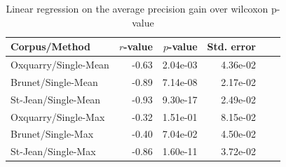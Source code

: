 \begin{table}
  \centering
  \caption{Linear regression on the average precision gain over wilcoxon p-value}
  \label{tab:rl_correlations_regression}
  \begin{tabular}{l r r r r r}
    \toprule
    Corpus/Method      & $r$-value & $p$-value & Std. error \\
    \midrule
    Oxquarry/Single-Mean & -0.63 & 2.04e-03 & 4.36e-02 \\
    Brunet/Single-Mean   & -0.89 & 7.14e-08 & 2.17e-02 \\
    St-Jean/Single-Mean  & -0.93 & 9.30e-17 & 2.49e-02 \\
    \midrule
    Oxquarry/Single-Max  & -0.32 & 1.51e-01 & 8.15e-02 \\
    Brunet/Single-Max    & -0.40 & 7.04e-02 & 4.50e-02 \\
    St-Jean/Single-Max   & -0.86 & 1.60e-11 & 3.72e-02 \\
    \bottomrule
  \end{tabular}
\end{table}
